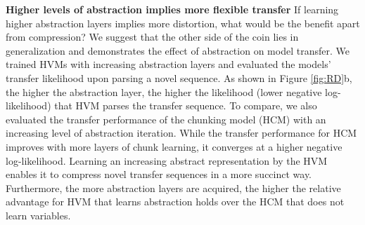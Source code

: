 \documentclass{article} %
\theoremstyle{remark}
\begin{document}
\textbf{Higher levels of abstraction implies more flexible transfer}
If learning higher abstraction layers implies more distortion, what would be the benefit apart from compression? We suggest that the other side of the coin lies in generalization and demonstrates the effect of abstraction on model transfer. We trained HVMs with increasing abstraction layers and evaluated the models' transfer likelihood upon parsing a novel sequence. As shown in Figure \ref{fig:RD}b, the higher the abstraction layer, the higher the likelihood (lower negative log-likelihood) that HVM parses the transfer sequence.
To compare, we also evaluated the transfer performance of the chunking model (HCM) with an increasing level of abstraction iteration. While the transfer performance for HCM improves with more layers of chunk learning, it converges at a higher negative log-likelihood. Learning an increasing abstract representation by the HVM enables it to compress novel transfer sequences in a more succinct way. Furthermore, the more abstraction layers are acquired, the higher the relative advantage for HVM that learns abstraction holds over the HCM that does not learn variables.
\end{document}
